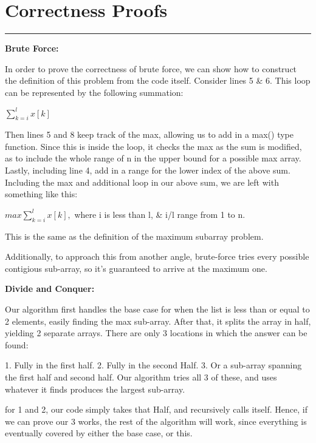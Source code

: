 \documentclass[letterpaper,10pt,titlepage,fleqn]{article}
\begin{document}
\lstset{ numbers=none }

\section*{Correctness Proofs}
\hrule

\begin{centering}
\textbf{Brute Force:}
\end{centering}

In order to prove the correctness of brute force, we can show how to construct the definition of this problem from the code itself. Consider lines 5 \& 6. This loop can be represented by the following summation:

$\sum\limits_{k=i}^{l} x[k]$

Then lines 5 and 8 keep track of the max, allowing us to add in a max() type function. Since this is inside the loop, it checks the max as the sum is modified, as to include the whole range of n in the upper bound for a possible max array. Lastly, including line 4, add in a range for the lower index of the above sum. Including the max and additional loop in our above sum, we are left with something like this:

$max \sum\limits_{k=i}^{l} x[k],$ where i is less than l, \& i/l range from 1 to n.

This is the same as the definition of the maximum subarray problem.

Additionally, to approach this from another angle, brute-force tries every possible contigious sub-array, so it's guaranteed to arrive at the maximum one.

\begin{centering}
\textbf{Divide and Conquer:}
\end{centering}


Our algorithm first handles the base case for when the list is less than or equal to 2 elements, easily finding the max sub-array.  After that, it splits the array in half, yielding 2 separate arrays.  There are only 3 locations in which the answer can be found:

1.  Fully in the first half.  2.  Fully in the second Half.  3.  Or a sub-array spanning the first half and second half.  Our algorithm tries all 3 of these, and uses whatever it finds produces the largest sub-array.

for 1 and 2, our code simply takes that Half, and recursively calls itself.  Hence, if we can prove our 3 works, the rest of the algorithm will work, since everything is eventually covered by either the base case, or this.
\end{document}
